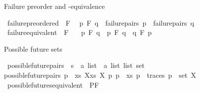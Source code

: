 \begin{isabellebody}
\begin{isamarkuptext}%
Failure preorder and -equivalence%
\end{isamarkuptext}\isamarkuptrue%
\isamarkupfalse%
\ failure{\isacharunderscore}{\kern0pt}preordered\ {\isacharparenleft}{\kern0pt}\ {\isacartoucheopen}{\isasymlesssim}F{\isacartoucheclose}\ {}{}{\isacharparenright}{\kern0pt}\ \isanewline
{\isacartoucheopen}p\ {\isasymlesssim}F\ q\ {\isasymequiv}\ failure{\isacharunderscore}{\kern0pt}pairs\ p\ {\isasymsubseteq}\ failure{\isacharunderscore}{\kern0pt}pairs\ q{\isacartoucheclose}\isanewline
\isanewline
{}\isamarkupfalse%
\ failure{\isacharunderscore}{\kern0pt}equivalent\ {\isacharparenleft}{\kern0pt}\ {\isacartoucheopen}{\isasymsimeq}F{\isacartoucheclose}\ {}{}{\isacharparenright}{\kern0pt}\ \isanewline
{\isacartoucheopen}\ p\ {\isasymsimeq}F\ q\ {\isasymequiv}\ p\ {\isasymlesssim}F\ q\ {\isasymand}\ q\ {\isasymlesssim}F\ p{\isacartoucheclose}%
\begin{isamarkuptext}%
Possible future sets%
\end{isamarkuptext}\isamarkuptrue%
\isamarkupfalse%
\ possible{\isacharunderscore}{\kern0pt}future{\isacharunderscore}{\kern0pt}pairs\ {\isacharcolon}{\kern0pt}{\isacharcolon}{\kern0pt}\ {\isacartoucheopen}{\isacharprime}{\kern0pt}s\ {\isasymRightarrow}\ {\isacharparenleft}{\kern0pt}{\isacharprime}{\kern0pt}a\ list\ {\isasymtimes}\ {\isacharprime}{\kern0pt}a\ list\ list{\isacharparenright}{\kern0pt}\ set{\isacartoucheclose}\isanewline
\ \ \isanewline
{\isacartoucheopen}possible{\isacharunderscore}{\kern0pt}future{\isacharunderscore}{\kern0pt}pairs\ p\ {\isasymequiv}\ {\isacharbraceleft}{\kern0pt}{\isacharparenleft}{\kern0pt}xs{\isacharcomma}{\kern0pt}\ X{\isacharparenright}{\kern0pt}{\isacharbar}{\kern0pt}xs\ X{\isachardot}{\kern0pt}\ {\isasymexists}p{\isacharprime}{\kern0pt}{\isachardot}{\kern0pt}\ p\ {\isasymmapsto}{\isachardollar}{\kern0pt}\ xs\ p{\isacharprime}{\kern0pt}\ {\isasymand}\ traces\ p{\isacharprime}{\kern0pt}\ {\isacharequal}{\kern0pt}\ {\isacharparenleft}{\kern0pt}set\ X{\isacharparenright}{\kern0pt}{\isacharbraceright}{\kern0pt}{\isacartoucheclose}\isanewline
\isanewline
{}\isamarkupfalse%
\ possible{\isacharunderscore}{\kern0pt}futures{\isacharunderscore}{\kern0pt}equivalent\ {\isacharparenleft}{\kern0pt}\ {\isacartoucheopen}{\isasymsimeq}PF{\isacartoucheclose}\ {}{}{\isacharparenright}{\kern0pt}\ \isanewline

\end{isabellebody}
